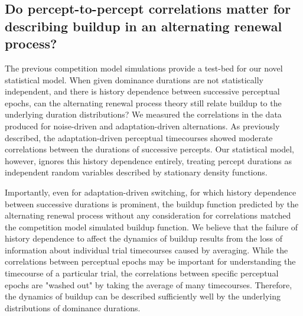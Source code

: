 \documentclass{frontiersSCNS} %
\begin{document}
\subsection{Do percept-to-percept correlations matter for describing buildup in an alternating renewal process?}

The previous competition model simulations provide a test-bed for our novel statistical model. When given dominance durations are not statistically independent, and there is history dependence between successive perceptual epochs, can the alternating renewal process theory still relate buildup to the underlying duration distributions? We measured the correlations in the data produced for noise-driven and adaptation-driven alternations. As previously described, the adaptation-driven perceptual timecourses showed moderate correlations between the durations of successive percepts. Our statistical model, however, ignores this history dependence entirely, treating percept durations as independent random variables described by stationary density functions. 

Importantly, even for adaptation-driven switching, for which history dependence between successive durations is prominent, the buildup function predicted by the alternating renewal process without any consideration for correlations matched the competition model simulated buildup function. We believe that the failure of history dependence to affect the dynamics of buildup results from the loss of information about individual trial timecourses caused by averaging. While the correlations between perceptual epochs may be important for understanding the timecourse of a particular trial, the correlations between specific perceptual epochs are "washed out" by taking the average of many timecourses. Therefore, the dynamics of buildup can be described sufficiently well by the underlying distributions of dominance durations.
\end{document}
